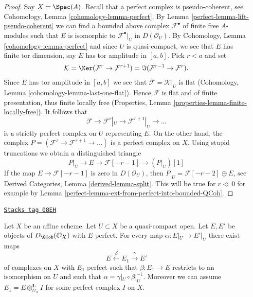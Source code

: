 \begin{proof}

Say $X = \Spec(A)$. Recall that a perfect complex is
pseudo-coherent, see
Cohomology, Lemma \ref{cohomology-lemma-perfect}.
By Lemma \ref{perfect-lemma-lift-pseudo-coherent} we can find a bounded above complex
$\mathcal{F}^\bullet$ of finite free $A$-modules such that $E$ is
isomorphic to $\mathcal{F}^\bullet|_U$ in $D(\mathcal{O}_U)$.
By Cohomology, Lemma \ref{cohomology-lemma-perfect} and since
$U$ is quasi-compact, we see that $E$ has finite tor dimension, say
$E$ has tor amplitude in $[a, b]$. Pick $r < a$ and set
$$
\mathcal{K} = \Ker(\mathcal{F}^{r} \to \mathcal{F}^{r + 1})
= \Im(\mathcal{F}^{r - 1} \to \mathcal{F}^r).
$$
Since $E$ has tor amplitude in $[a, b]$ we see that
$\mathcal{F} = \mathcal{K}|_U$ is
flat (Cohomology, Lemma \ref{cohomology-lemma-last-one-flat}).
Hence $\mathcal{F}$ is flat and of finite presentation, thus finite
locally free (Properties, Lemma \ref{properties-lemma-finite-locally-free}).
It follows that
$$
\mathcal{F} \to \mathcal{F}^r|_U \to \mathcal{F}^{r + 1}|_U \to \ldots
$$
is a strictly perfect complex on $U$ representing $E$. On the other hand,
the complex $P = (\mathcal{F}^r \to \mathcal{F}^{r + 1} \to \ldots )$
is a perfect complex on $X$. Using
stupid truncations we obtain a distinguished triangle
$$
P|_U \to E \to \mathcal{F}[-r - 1] \to (P|_U)[1]
$$
If the map $E \to \mathcal{F}[-r - 1]$ is zero in $D(\mathcal{O}_U)$,
then $P|_U = \mathcal{F}[-r - 2] \oplus E$, see
Derived Categories, Lemma \ref{derived-lemma-split}.
This will be true for $r \ll 0$ for example by
Lemma \ref{perfect-lemma-ext-from-perfect-into-bounded-QCoh}.
\end{proof}

\begin{lemma}
\label{perfect-lemma-lift-map}
\href{https://stacks.math.columbia.edu/tag/08EH}{\texttt{Stacks tag 08EH}}

Let $X$ be an affine scheme. Let $U \subset X$ be a quasi-compact open.
Let $E, E'$ be objects of $D_\QCoh(\mathcal{O}_X)$ with $E$ perfect.
For every map $\alpha : E|_U \to E'|_U$ there exist maps
$$
E \xleftarrow{\beta} E_1 \xrightarrow{\gamma} E'
$$
of complexes on $X$ with $E_1$ perfect such that $\beta : E_1 \to E$
restricts to an isomorphism on $U$ and such that
$\alpha = \gamma|_U \circ \beta|_U^{-1}$.
Moreover we can assume $E_1 = E \otimes_{\mathcal{O}_X}^\mathbf{L} I$
for some perfect complex $I$ on $X$.
\end{lemma}

